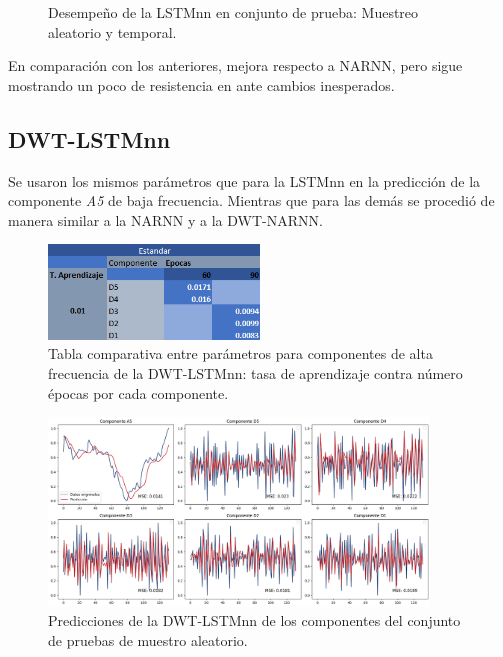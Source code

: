 \begin{figure}[H]
\begin{minipage}{0.5\textwidth}
    \end{minipage}
    \caption{Desempeño de la LSTMnn en conjunto de prueba: Muestreo aleatorio y temporal.} 
    \label{fig:c_prueba_LSTM}
\end{figure}

En comparación con los anteriores, mejora respecto a NARNN, pero sigue mostrando un poco de resistencia en ante cambios inesperados.

\newpage
\subsection{DWT-LSTMnn}

Se usaron los mismos parámetros que para la LSTMnn en la predicción de la componente \textit{A5} de baja frecuencia. Mientras que para las demás se procedió de manera similar a la NARNN y a la DWT-NARNN.

\begin{figure}[H]
    \centering
    \includegraphics[width=0.5\textwidth]{Figuras/proceso_de_entrenamiento/lr_epocas_DWT_LSTM_estandar_componentes.png}
    \caption{Tabla comparativa entre parámetros para componentes de alta frecuencia de la DWT-LSTMnn: tasa de aprendizaje contra número épocas por cada componente.} 
    \label{fig:lr_epocas_DWT_LSTMnn_componentes}
\end{figure}

\begin{figure}[H]
    \centering
    \includegraphics[width=0.9\textwidth]{Figuras/proceso_de_entrenamiento/grafs_c_prueba/muestreo_aleatorio/DWT_LSTM/estandar/DWT_LSTM.png}
    \caption{Predicciones de la DWT-LSTMnn de los componentes del conjunto de pruebas de muestro aleatorio.} 
    \label{fig:c_prueba_componentes_DWT_LSTM_aleatorio}
\end{figure}

